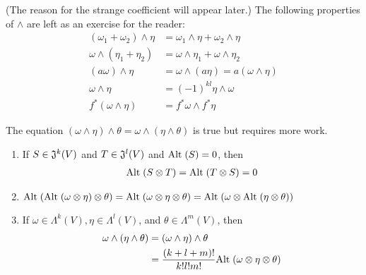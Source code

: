 (The reason for the strange coefficient will appear later.) The following properties of 
$\wedge$ are left as an exercise for the reader:
\begin{align*}
    (\omega_1+\omega_2)\wedge \eta & = \omega_1\wedge\eta + \omega_2\wedge\eta \\
    \omega\wedge(\eta_1+\eta_2) & = \omega\wedge\eta_1 + \omega\wedge\eta_2 \\
    (a\omega)\wedge\eta & = \omega\wedge(a\eta) = a(\omega\wedge\eta) \\
    \omega\wedge\eta & = (-1)^{kl}\eta\wedge\omega \\
    f^*(\omega\wedge\eta) & = f^*\omega\wedge f^*\eta 
\end{align*}

The equation $(\omega\wedge\eta)\wedge\theta = \omega\wedge(\eta\wedge\theta)$ is true 
but requires more work.

\begin{theorem}
    \begin{enumerate}[label=\upshape{(\arabic*)}]
        \item If $S\in \mathfrak{J}^k(V)$ and $T\in \mathfrak{J}^l(V)$ and $\mathrm{Alt}\;(S) =0$, then 
            \begin{align*}
                \mathrm{Alt}\;(S\otimes T) = \mathrm{Alt}\;(T\otimes S) = 0
            \end{align*}
        \item $\mathrm{Alt}\;(\mathrm{Alt}\; (\omega\otimes\eta)\otimes\theta) = \mathrm{Alt}\;(\omega\otimes\eta\otimes\theta)
            = \mathrm{Alt}\;(\omega\otimes\mathrm{Alt}\;(\eta\otimes\theta))$
        \item If $\omega\in \Lambda^k(V), \eta\in \Lambda^l(V)$, and $\theta\in \Lambda^m(V)$, then 
            \begin{align*}
                \omega\wedge(\eta\wedge\theta) 
                & = (\omega\wedge\eta)\wedge\theta \\
                & = \frac{(k+l+m)!}{k!l!m!}\mathrm{Alt}\;(\omega\otimes\eta\otimes\theta)
            \end{align*}
    \end{enumerate}
\end{theorem}

